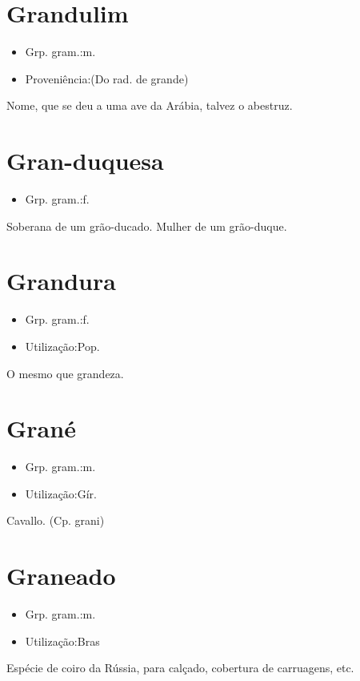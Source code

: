 \section{Grandulim}
\begin{itemize}
\item {Grp. gram.:m.}
\end{itemize}
\begin{itemize}
\item {Proveniência:(Do rad. de \textunderscore grande\textunderscore )}
\end{itemize}
Nome, que se deu a uma ave da Arábia, talvez o abestruz.
\section{Gran-duquesa}
\begin{itemize}
\item {Grp. gram.:f.}
\end{itemize}
Soberana de um grão-ducado.
Mulher de um grão-duque.
\section{Grandura}
\begin{itemize}
\item {Grp. gram.:f.}
\end{itemize}
\begin{itemize}
\item {Utilização:Pop.}
\end{itemize}
O mesmo que \textunderscore grandeza\textunderscore .
\section{Grané}
\begin{itemize}
\item {Grp. gram.:m.}
\end{itemize}
\begin{itemize}
\item {Utilização:Gír.}
\end{itemize}
Cavallo.
(Cp. \textunderscore grani\textunderscore )
\section{Graneado}
\begin{itemize}
\item {Grp. gram.:m.}
\end{itemize}
\begin{itemize}
\item {Utilização:Bras}
\end{itemize}
Espécie de coiro da Rússia, para calçado, cobertura de carruagens, etc.
